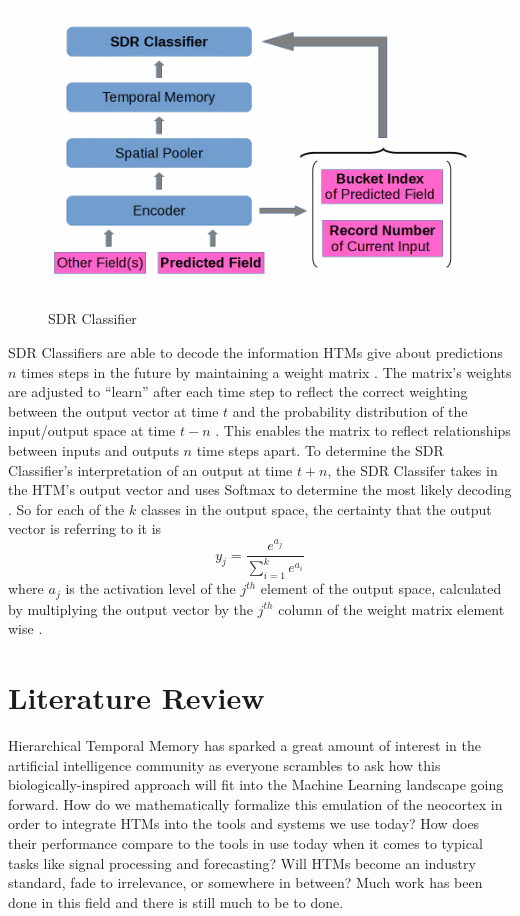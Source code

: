 \documentclass[fleqn,notitlepage,minimal]{article}
\begin{document}
	\begin{figure}[h!]
		\centering
		\includegraphics[width=\linewidth]{images/SDRClassifier.jpg}
		\caption{SDR Classifier}
		\label{fig 3}
	\end{figure}
	
	SDR Classifiers are able to decode the information HTMs give about predictions $n$ times steps in the future by maintaining a weight matrix \cite{Dillon}. The matrix's weights are adjusted to ``learn'' after each time step to reflect the correct weighting between the output vector at time $t$ and the probability distribution of the input/output space at time $t-n$ \cite{Dillon}. This enables the matrix to reflect relationships between inputs and outputs $n$ time steps apart. To determine the SDR Classifier's interpretation of an output at time $t+n$, the SDR Classifer takes in the HTM's output vector and uses Softmax to determine the most likely decoding \cite{Dillon}. So for each of the $k$ classes in the output space, the certainty that the output vector is referring to it is $$y_{j} = \dfrac{e^{a_{j}}}{\sum_{i=1}^{k} e^{a_{i}}}$$ where $a_{j}$ is the activation level of the $j^{th}$ element of the output space, calculated by multiplying the output vector by the $j^{th}$ column of the weight matrix element wise \cite{Dillon}. 
	
	
	
	\section{Literature Review}
	
	Hierarchical Temporal Memory has sparked a great amount of interest in the artificial intelligence community as everyone scrambles to ask how this biologically-inspired approach will fit into the Machine Learning landscape going forward. How do we mathematically formalize this emulation of the neocortex in order to integrate HTMs into the tools and systems we use today? How does their performance compare to the tools in use today when it comes to typical tasks like signal processing and forecasting? Will HTMs become an industry standard, fade to irrelevance, or somewhere in between? Much work has been done in this field and there is still much to be to done.
	
\end{document}
